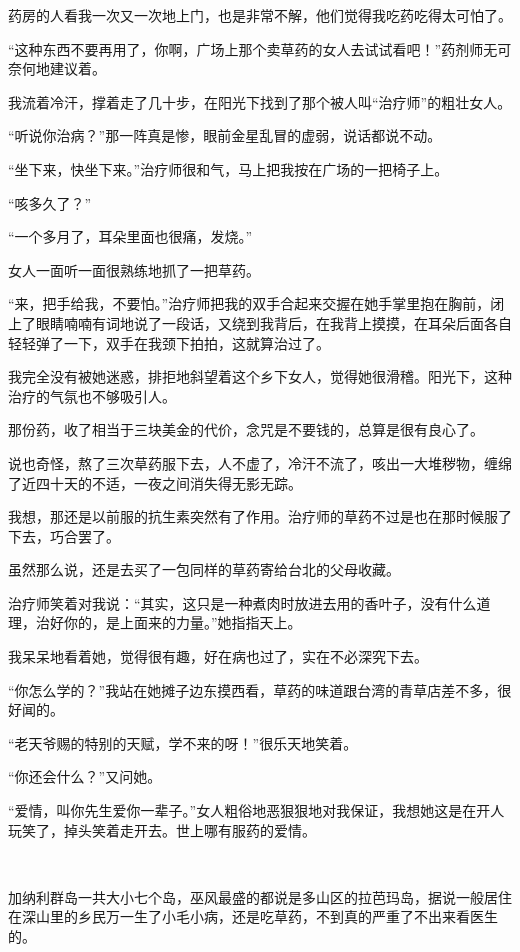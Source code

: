 \par 药房的人看我一次又一次地上门，也是非常不解，他们觉得我吃药吃得太可怕了。
\par “这种东西不要再用了，你啊，广场上那个卖草药的女人去试试看吧！”药剂师无可奈何地建议着。
\par 我流着冷汗，撑着走了几十步，在阳光下找到了那个被人叫“治疗师”的粗壮女人。
\par “听说你治病？”那一阵真是惨，眼前金星乱冒的虚弱，说话都说不动。
\par “坐下来，快坐下来。”治疗师很和气，马上把我按在广场的一把椅子上。
\par “咳多久了？”
\par “一个多月了，耳朵里面也很痛，发烧。”
\par 女人一面听一面很熟练地抓了一把草药。
\par “来，把手给我，不要怕。”治疗师把我的双手合起来交握在她手掌里抱在胸前，闭上了眼睛喃喃有词地说了一段话，又绕到我背后，在我背上摸摸，在耳朵后面各自轻轻弹了一下，双手在我颈下拍拍，这就算治过了。
\par 我完全没有被她迷惑，排拒地斜望着这个乡下女人，觉得她很滑稽。阳光下，这种治疗的气氛也不够吸引人。
\par 那份药，收了相当于三块美金的代价，念咒是不要钱的，总算是很有良心了。
\par 说也奇怪，熬了三次草药服下去，人不虚了，冷汗不流了，咳出一大堆秽物，缠绵了近四十天的不适，一夜之间消失得无影无踪。
\par 我想，那还是以前服的抗生素突然有了作用。治疗师的草药不过是也在那时候服了下去，巧合罢了。
\par 虽然那么说，还是去买了一包同样的草药寄给台北的父母收藏。
\par 治疗师笑着对我说：“其实，这只是一种煮肉时放进去用的香叶子，没有什么道理，治好你的，是上面来的力量。”她指指天上。
\par 我呆呆地看着她，觉得很有趣，好在病也过了，实在不必深究下去。
\par “你怎么学的？”我站在她摊子边东摸西看，草药的味道跟台湾的青草店差不多，很好闻的。
\par “老天爷赐的特别的天赋，学不来的呀！”很乐天地笑着。
\par “你还会什么？”又问她。
\par “爱情，叫你先生爱你一辈子。”女人粗俗地恶狠狠地对我保证，我想她这是在开人玩笑了，掉头笑着走开去。世上哪有服药的爱情。
\par  
\par 加纳利群岛一共大小七个岛，巫风最盛的都说是多山区的拉芭玛岛，据说一般居住在深山里的乡民万一生了小毛小病，还是吃草药，不到真的严重了不出来看医生的。
